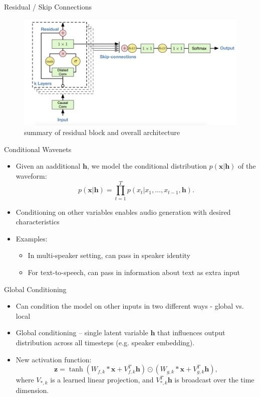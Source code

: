 \documentclass{beamer}
\begin{document}
  \begin{frame}{Residual / Skip Connections}
    \begin{figure}
      \includegraphics[width=1.0\textwidth]{img/residual_layer.png}
      \caption{summary of residual block and overall architecture}
    \end{figure}
  \end{frame}

  \begin{frame}{Conditional Wavenets}
    \begin{itemize}
      \item Given an aadditional $\mathbf{h}$, we model the conditional distribution $p(\mathbf{x} | \mathbf{h})$ of the waveform:
        \[
          p(\mathbf{x} | \mathbf{h}) = \prod_{t=1}^T p(x_t | x_1, \dots, x_{t-1}, \mathbf{h}).
        \]
     \item Conditioning on other variables enables audio generation with desired characteristics
     \item Examples: 
      \begin{itemize} 
       \item In multi-speaker setting, can pass in speaker identity
       \item For text-to-speech, can pass in information about text as extra input
      \end{itemize}
    \end{itemize}
  \end{frame}


  \begin{frame}{Global Conditioning}
    \begin{itemize}
      \item Can condition the model on other inputs in two different ways - global vs. local
      \item Global conditioning -- single latent variable $\mathbf{h}$ that influences output distribution across all timesteps (e.g. speaker embedding).    
      \item New activation function:
        \[
          \mathbf{z} = \tanh(W_{f, k} * \mathbf{x} + V_{f, k}^T \mathbf{h}) \odot (W_{g, k} * \mathbf{x} + V_{g, k}^T \mathbf{h}),
        \]
        where $V_{*, k}$ is a learned linear projection, and $V_{*, k}^T \mathbf{h}$ is broadcast over the time dimension.
    \end{itemize}
  \end{frame}
\end{document}
